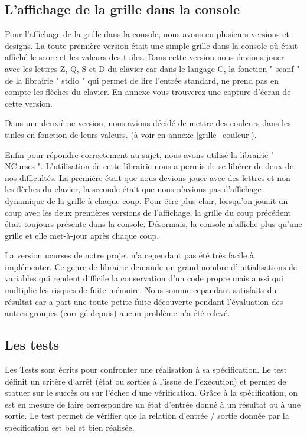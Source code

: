 \documentclass[12pt]{article}
\begin{document}
\subsection{L'affichage de la grille dans la console}
Pour l'affichage de la grille dans la console, nous avons eu plusieurs versions
et designs. La toute première version était une simple grille dans la console
o\`u était affiché le score et les valeurs des tuiles. Dans cette version
nous devions jouer avec les lettres Z, Q, S et D du clavier car dans le langage C, la
fonction " scanf " de la librairie " stdio " qui permet de
lire l'entrée standard, ne prend pas en compte les flèches du clavier.
En annexe vous trouverez une capture d'écran de cette version.\par
Dans une deuxième version, nous avions décidé de mettre des couleurs dans
les tuiles en fonction de leurs valeurs. (à voir en annexe \ref{grille_couleur}).\par
Enfin pour répondre correctement au sujet, nous avons utilisé la librairie
" NCurses ". L'utilisation de cette librairie nous a permis de se
libérer de deux de nos difficultés. La première était que nous devions jouer
avec des lettres et non les flèches du clavier, la seconde était que nous
n'avions pas d'affichage dynamique de la grille à chaque coup. Pour être plus
clair, lorsqu'on jouait un coup avec les deux premières versions de
l'affichage, la grille du coup précédent était toujours présente dans la
console. Désormais, la console n'affiche plus qu'une grille et elle met-à-jour après chaque coup.\par

La version ncurses de notre projet n'a cependant pas été très facile à implémenter.
Ce genre de librairie demande un grand nombre d'initialisations de variables qui rendent
difficile la conservation d'un code propre mais aussi qui multiplie les risques de fuite mémoire.
Nous somme cepandant satisfaits du résultat car a part une toute petite fuite
découverte pendant l'évaluation des autres groupes (corrigé depuis) aucun problème n'a été relevé.

\subsection{Les tests}
Les Tests sont écrits pour confronter une réalisation à sa spécification.
Le test définit un critère d’arrêt (état ou sorties à l’issue de
l’exécution) et permet de statuer sur le succès ou sur l’échec d’une
vérification. Gr\^ace à la spécification, on est en mesure de faire
correspondre un état d’entrée donné à un résultat ou à une sortie.
Le test permet de vérifier que la relation d’entrée / sortie donnée par la
spécification est bel et bien réalisée.
\cite{Test_unitaire}
\end{document}
